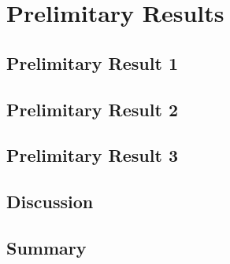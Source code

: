 \chapter{Prelimitary Results}
\label{chap.mainresults}

\section{Prelimitary Result 1}

\section{Prelimitary Result 2}

\section{Prelimitary Result 3}

\section{Discussion}

\section{Summary}
